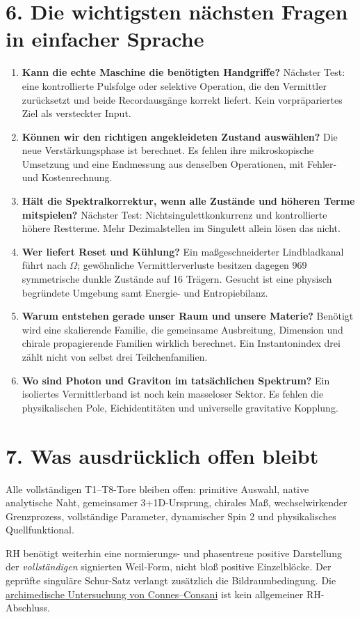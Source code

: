 \documentclass[11pt,a4paper,oneside,parskip=half,headings=normal]{scrreprt}
\begin{document}
\section*{6. Die wichtigsten nächsten Fragen in einfacher Sprache}
\begin{enumerate}
\item \textbf{Kann die echte Maschine die benötigten Handgriffe?}
Nächster Test: eine kontrollierte Pulsfolge oder selektive Operation, die den Vermittler zurücksetzt und beide Recordausgänge korrekt liefert. Kein vorpräpariertes Ziel als versteckter Input.
\item \textbf{Können wir den richtigen angekleideten Zustand auswählen?}
Die neue Verstärkungsphase ist berechnet. Es fehlen ihre mikroskopische Umsetzung und eine Endmessung aus denselben Operationen, mit Fehler- und Kostenrechnung.
\item \textbf{Hält die Spektralkorrektur, wenn alle Zustände und höheren Terme mitspielen?}
Nächster Test: Nichtsingulettkonkurrenz und kontrollierte höhere Restterme. Mehr Dezimalstellen im Singulett allein lösen das nicht.
\item \textbf{Wer liefert Reset und Kühlung?}
Ein maßgeschneiderter Lindbladkanal führt nach $\Omega$; gewöhnliche Vermittlerverluste besitzen dagegen 969 symmetrische dunkle Zustände auf 16 Trägern. Gesucht ist eine physisch begründete Umgebung samt Energie- und Entropiebilanz.
\item \textbf{Warum entstehen gerade unser Raum und unsere Materie?}
Benötigt wird eine skalierende Familie, die gemeinsame Ausbreitung, Dimension und chirale propagierende Familien wirklich berechnet. Ein Instantonindex drei zählt nicht von selbst drei Teilchenfamilien.
\item \textbf{Wo sind Photon und Graviton im tatsächlichen Spektrum?}
Ein isoliertes Vermittlerband ist noch kein masseloser Sektor. Es fehlen die physikalischen Pole, Eichidentitäten und universelle gravitative Kopplung.
\end{enumerate}

\section*{7. Was ausdrücklich offen bleibt}
Alle vollständigen T1--T8-Tore bleiben offen: primitive Auswahl, native analytische Naht, gemeinsamer 3+1D-Ursprung, chirales Maß, wechselwirkender Grenzprozess, vollständige Parameter, dynamischer Spin 2 und physikalisches Quellfunktional.

RH benötigt weiterhin eine normierungs- und phasentreue positive Darstellung der \emph{vollständigen} signierten Weil-Form, nicht bloß positive Einzelblöcke. Der geprüfte singuläre Schur-Satz verlangt zusätzlich die Bildraumbedingung. Die \href{https://arxiv.org/abs/2006.13771}{archimedische Untersuchung von Connes--Consani} ist kein allgemeiner RH-Abschluss.
\end{document}
